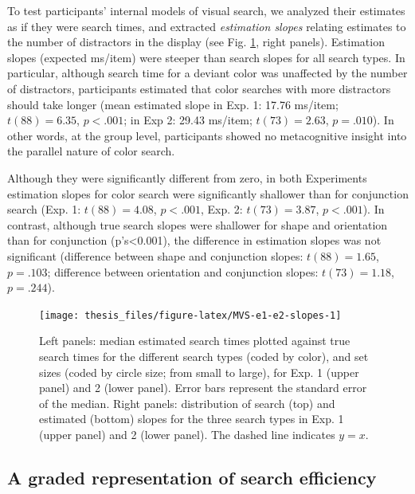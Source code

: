 \documentclass[12pt,twoside]{reedthesis}
\begin{document}
To test participants' internal models of visual search, we analyzed their estimates as if they were search times, and extracted \emph{estimation slopes} relating estimates to the number of distractors in the display (see Fig. \ref{fig:MVS-e1-e2-slopes}, right panels). Estimation slopes (expected ms/item) were steeper than search slopes for all search types. In particular, although search time for a deviant color was unaffected by the number of distractors, participants estimated that color searches with more distractors should take longer (mean estimated slope in Exp. 1: 17.76 ms/item; \(t(88) = 6.35\), \(p < .001\); in Exp 2: 29.43 ms/item; \(t(73) = 2.63\), \(p = .010\)). In other words, at the group level, participants showed no metacognitive insight into the parallel nature of color search.

Although they were significantly different from zero, in both Experiments estimation slopes for color search were significantly shallower than for conjunction search (Exp. 1: \(t(88) = 4.08\), \(p < .001\), Exp. 2: \(t(73) = 3.87\), \(p < .001\)). In contrast, although true search slopes were shallower for shape and orientation than for conjunction (p's\textless0.001), the difference in estimation slopes was not significant (difference between shape and conjunction slopes: \(t(88) = 1.65\), \(p = .103\); difference between orientation and conjunction slopes: \(t(73) = 1.18\), \(p = .244\)).
\begin{figure}
\texttt{[image: thesis\_files/figure-latex/MVS-e1-e2-slopes-1]} \caption[Search time estimates accuracy, Experiments 1 and 2]{Left panels: median estimated search times plotted against true search times for the different search types (coded by color), and set sizes (coded by circle size; from small to large), for Exp. 1 (upper panel) and 2 (lower panel). Error bars represent the standard error of the median. Right panels: distribution of search (top) and estimated (bottom) slopes for the three search types in Exp. 1 (upper panel) and 2 (lower panel). The dashed line indicates $y=x$.}\label{fig:MVS-e1-e2-slopes}
\end{figure}
\hypertarget{a-graded-representation-of-search-efficiency}{%
\subsection*{A graded representation of search efficiency}\label{a-graded-representation-of-search-efficiency}}
\end{document}
